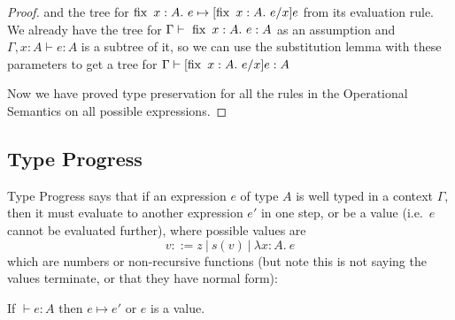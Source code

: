 \begin{proof}
and the tree for $\fix \ x:A . \ e \mapsto [\fix \ x:A.  \ e/x]e$ from its evaluation rule. We already have the tree for $\Gamma \vdash \  \operatorname{fix} \ x:A . \ e : A$ as an assumption and $ \Gamma, x : A \vdash e : A$ is a subtree of it, so we can use the substitution lemma with these parameters to get a tree for $\Gamma \vdash [\operatorname{fix} \ x:A . \ e/x]e :  A$

\vspace{1cm}

Now we have proved type preservation for all the rules in the Operational Semantics on all possible expressions.
\end{proof}

\subsection{Type Progress}\label{prog}
Type Progress says that if an expression $e$ of type $A$ is well typed in a context $\Gamma$, then it must evaluate to another expression $e'$ in one step, or be a value (i.e.\ $e$ cannot be evaluated further), where possible values are 
\[v ::= z \ | \ s(v) \ | \ \lambda x : A. \ e\]
which are numbers or non-recursive functions (but note this is not saying the values terminate, or that they have normal form):

\vspace{0.5cm}

\begin{thm}
If $\vdash e : A$ then $e \mapsto e'$ or $e$ is a value.
\end{thm}

